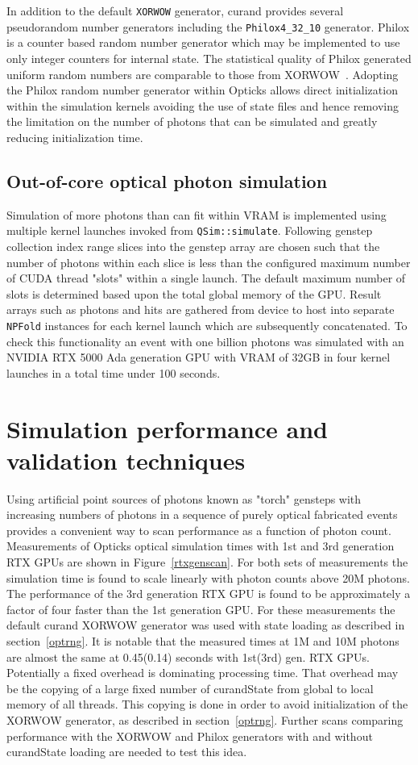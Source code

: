 \documentclass{webofc}
\begin{document}
In addition to the default {\tt XORWOW} generator, curand provides several 
pseudorandom number generators including the {\tt Philox4\_32\_10} generator.
Philox is a counter based random number generator which may be implemented to 
use only integer counters for internal state. 
The statistical quality of Philox generated uniform random numbers are comparable 
to those from XORWOW~\cite{curand}.
Adopting the Philox random number generator within Opticks allows direct initialization within
the simulation kernels avoiding the use of state files and hence removing the 
limitation on the number of photons that can be simulated and greatly reducing 
initialization time. 
%
\subsection{Out-of-core optical photon simulation}
%
Simulation of more photons than can fit within VRAM is implemented
using multiple kernel launches invoked from {\tt QSim::simulate}. 
Following genstep collection index range slices into the genstep array 
are chosen such that the number of photons within each slice is less than 
the configured maximum number of CUDA thread "slots" within a single launch.
The default maximum number of slots is determined based upon the total
global memory of the GPU. Result arrays such as photons and hits are gathered
from device to host into separate {\tt NPFold} instances for each kernel launch 
which are subsequently concatenated. To check this functionality 
an event with one billion photons was simulated with an NVIDIA RTX 5000 Ada 
generation GPU with VRAM of 32GB in four kernel launches 
in a total time under 100 seconds. 
%
\section{Simulation performance and validation techniques}
%
Using artificial point sources of photons known as "torch" gensteps with increasing numbers of photons in a sequence of 
purely optical fabricated events provides a convenient way to scan performance as 
a function of photon count. Measurements of Opticks optical simulation times with 1st and 3rd generation 
RTX GPUs are shown in Figure~\ref{rtxgenscan}.
For both sets of measurements the simulation time is found to scale linearly with photon counts
above 20M photons. The performance of the 3rd generation RTX GPU is found to be approximately a factor of four faster 
than the 1st generation GPU. For these measurements the default curand XORWOW generator 
was used with state loading as described in section~\ref{optrng}.  
%
It is notable that the measured times at 1M and 10M photons are almost the same at 0.45(0.14) 
seconds with 1st(3rd) gen. RTX GPUs. Potentially a fixed overhead is dominating processing time. 
That overhead may be the copying of a large fixed number of curandState 
from global to local memory of all threads. This copying is done in order to avoid 
initialization of the XORWOW generator, as described in section~\ref{optrng}.
Further scans comparing performance with the XORWOW and Philox generators
with and without curandState loading are needed to test this idea.  
\end{document}
